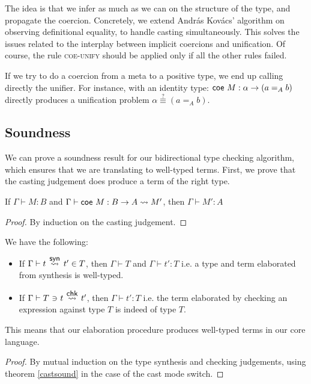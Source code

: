 \documentclass{article}
\renewcommand{\to}{\rightarrow}
\begin{document}
The idea is that we infer as much as we can on the structure of the type, and propagate the coercion. Concretely,
we extend András Kovács' algorithm on observing definitional equality, to handle casting simultaneously. This solves
the issues related to the interplay between implicit coercions and unification. Of course, the rule \textsc{coe-unify} 
should be applied only if all the other rules failed.  

\begin{exemple}
    If we try to do a coercion from a meta to a positive type, we end up calling directly the unifier. For instance,
    with an identity type: $\cast M : \alpha \to (a =_A b)$ directly produces a unification problem $\alpha \overset{?}{\equiv} (a =_A b)$.
\end{exemple}

\subsection{Soundness}

We can prove a soundness result for our bidirectional type checking algorithm, which ensures that we
are translating to well-typed terms. First, we prove that the casting judgement does produce a term of the
right type.

\begin{theoreme}\label{castsound}
    If $\Gamma \vdash M: B$ and $\Gamma \vdash \cast M : B \to A \rightsquigarrow M'$, then $\Gamma \vdash M':A$
\end{theoreme}

\begin{proof}
    By induction on the casting judgement.
\end{proof}

\begin{theoreme}
    We have the following:

    \begin{itemize}
        \item If $\Gamma \vdash t \syn t' \in T$, then $\Gamma \vdash T$ and $\Gamma \vdash t' : T$ i.e. a type 
            and term elaborated from synthesis is well-typed. 
        \item If $\Gamma \vdash T \ni t \chk t'$, then $\Gamma \vdash t' : T$ i.e. the term elaborated by checking
            an expression against type $T$ is indeed of type $T$.
    \end{itemize}

    This means that our elaboration procedure produces well-typed terms in our core language.
\end{theoreme}
\begin{proof}
    By mutual induction on the type synthesis and checking judgements, using theorem \ref{castsound} in
    the case of the cast mode switch.
\end{proof}
\end{document}
